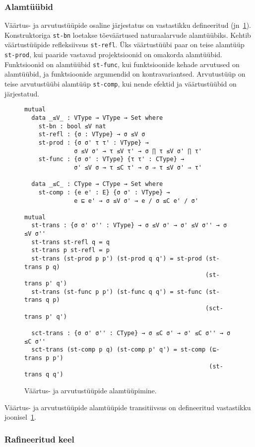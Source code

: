 \documentclass[a4paper,12pt]{article}
\begin{document}
\subsubsection{Alamtüübid}
Väärtus- ja arvutustüüpide osaline järjestatus on vastastikku defineeritud (jn~\ref{fig:exc.subtypes}).
Konstruktoriga {\tt st-bn} loetakse tõeväärtused naturaalarvude alamtüübiks.
Kehtib väärtustüüpide refleksiivsus {\tt st-refl}.
Üks väärtustüübi paar on teise alamtüüp {\tt st-prod}, kui paaride vastavad projektsioonid on omakorda alamtüübid.
Funktsioonid on alamtüübid {\tt st-func}, kui funktsioonide kehade arvutused on alamtüübid,
ja funktsioonide argumendid on kontravariantsed.
Arvutustüüp on teise arvutustüübi alamtüüp {\tt st-comp}, kui nende efektid ja väärtustüübid on järjestatud.
\begin{figure}
  \begin{BVerbatim}
mutual
  data _≤V_ : VType → VType → Set where
    st-bn : bool ≤V nat
    st-refl : {σ : VType} → σ ≤V σ
    st-prod : {σ σ' τ τ' : VType} →
              σ ≤V σ' → τ ≤V τ' → σ ∏ τ ≤V σ' ∏ τ'
    st-func : {σ σ' : VType} {τ τ' : CType} →
              σ' ≤V σ → τ ≤C τ' → σ ⇒ τ ≤V σ' ⇒ τ'

  data _≤C_ : CType → CType → Set where
    st-comp : {e e' : E} {σ σ' : VType} →
              e ⊑ e' → σ ≤V σ' → e / σ ≤C e' / σ'

mutual
  st-trans : {σ σ' σ'' : VType} → σ ≤V σ' → σ' ≤V σ'' → σ ≤V σ''
  st-trans st-refl q = q
  st-trans p st-refl = p
  st-trans (st-prod p p') (st-prod q q') = st-prod (st-trans p q)
                                                   (st-trans p' q')
  st-trans (st-func p p') (st-func q q') = st-func (st-trans q p)
                                                   (sct-trans p' q')

  sct-trans : {σ σ' σ'' : CType} → σ ≤C σ' → σ' ≤C σ'' → σ ≤C σ''
  sct-trans (st-comp p q) (st-comp p' q') = st-comp (⊑-trans p p')
                                                    (st-trans q q')
  \end{BVerbatim}
  \caption{Väärtus- ja arvutustüüpide alamtüüpimine.}
  \label{fig:exc.subtypes}
\end{figure}

Väärtus- ja arvutustüüpide alamtüüpide transitiivsus on defineeritud vastastikku joonisel~\ref{fig:exc.subtypes}.

\subsubsection{Rafineeritud keel}
\end{document}
